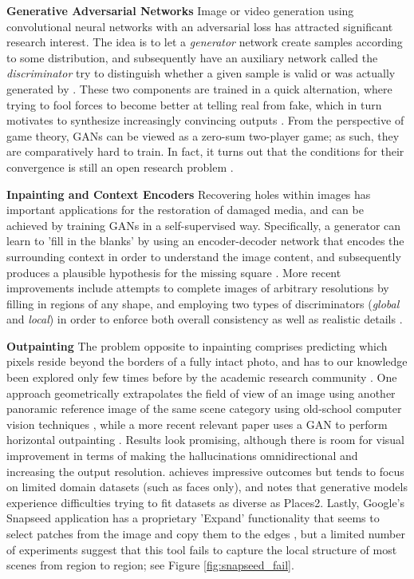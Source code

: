 \documentclass[twocolumn,showpacs,nofootinbib,aps,superscriptaddress,eqsecnum,prd,notitlepage,showkeys,10pt]{revtex4-1}
\begin{document}
\textbf{Generative Adversarial Networks} \hspace{0.3cm}
Image or video generation using convolutional neural networks with an adversarial loss \cite{Goodfellow2014} has attracted significant research interest. The idea is to let a \textit{generator} network  create samples according to some distribution, and subsequently have an auxiliary network called the \textit{discriminator}  try to distinguish whether a given sample is valid or was actually generated by . These two components are trained in a quick alternation, where  trying to fool  forces  to become better at telling real from fake, which in turn motivates  to synthesize increasingly convincing outputs \cite{Iizuka2017}. From the perspective of game theory, GANs can be viewed as a zero-sum two-player game; as such, they are comparatively hard to train. In fact, it turns out that the conditions for their convergence is still an open research problem \cite{Mescheder2018}.

\textbf{Inpainting and Context Encoders} \hspace{0.3cm}
Recovering holes within images has important applications for the restoration of damaged media, and can be achieved by training GANs in a self-supervised way. Specifically, a generator can learn to 'fill in the blanks' by using an encoder-decoder network that encodes the surrounding context in order to understand the image content, and subsequently produces a plausible hypothesis for the missing square \cite{Pathak2016}. More recent improvements include attempts to complete images of arbitrary resolutions by filling in regions of any shape, and employing two types of discriminators (\textit{global} and \textit{local}) in order to enforce both overall consistency as well as realistic details \cite{Iizuka2017}.

\textbf{Outpainting} \hspace{0.3cm}
The problem opposite to inpainting comprises predicting which pixels reside beyond the borders of a fully intact photo, and has to our knowledge been explored only few times before by the academic research community \cite{Zhang2013, Sabini2018, Wang2019}. One approach geometrically extrapolates the field of view of an image using another panoramic reference image of the same scene category using old-school computer vision techniques \cite{Zhang2013}, while a more recent relevant paper uses a GAN to perform horizontal outpainting \cite{Sabini2018}. Results look promising, although there is room for visual improvement in terms of making the hallucinations omnidirectional and increasing the output resolution. \cite{Wang2019} achieves impressive outcomes but tends to focus on limited domain datasets (such as faces only), and notes that generative models experience difficulties trying to fit datasets as diverse as Places2. Lastly, Google's Snapseed application has a proprietary 'Expand' functionality that seems to select patches from the image and copy them to the edges \cite{snapseed}, but a limited number of experiments suggest that this tool fails to capture the local structure of most scenes from region to region; see Figure \ref{fig:snapseed_fail}.
\end{document}

